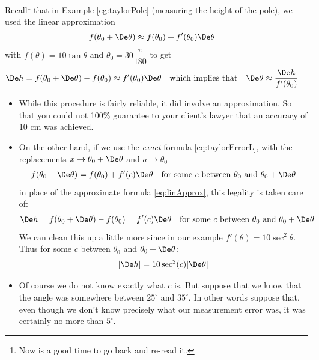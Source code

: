 \begin{eg}[More on $e^x$]
\end{eg}

\begin{eg}\label{eg_3_4_6}
Recall\footnote{Now is a good time to go back and re-read it.} that in Example
\ref{eg:taylorPole} (measuring the height of the pole), we
used the linear approximation
\begin{align*}%
f(\theta_0+\De\theta)&\approx f(\theta_0)+f'(\theta_0)\De\theta
\end{align*}
with $f(\theta)=10\tan\theta$ and $\theta_0=30\dfrac{\pi}{180}$ to get
\begin{align*}
\De h &=f(\theta_0+\De\theta)-f(\theta_0)\approx f'(\theta_0)\De\theta
  & \text{which implies that} &
  &\De\theta &\approx \frac{\De h}{f'(\theta_0)}
\end{align*}
\begin{itemize}
\item While this procedure is fairly reliable, it did involve an approximation.
So that you could not 100\% guarantee to your client's lawyer  that an accuracy of 10 cm
was achieved.
\item On the other hand, if we use the \emph{exact} formula \eqref{eq:taylorErrorL}, with
the replacements
$x\rightarrow \theta_0+\De\theta$ and $a\rightarrow\theta_0$
\begin{align*}
f(\theta_0+\De\theta)&=f(\theta_0)+f'(c)\De\theta
& \text{for some $c$ between $\theta_0$ and $\theta_0+\De\theta$}
\end{align*}
in place of the approximate formula \eqref{eq:linApprox}, this legality
is taken care of:
\begin{align*}
\De h &=f(\theta_0+\De\theta)-f(\theta_0) =f'(c)\De\theta
& \text{for some $c$ between $\theta_0$ and $\theta_0+\De\theta$}
\end{align*}
We can clean this up a little more since in our example $f'(\theta) = 10\sec^2\theta$.
Thus for some $c$ between $\theta_0$ and $\theta_0 + \De\theta$:
\begin{align*}
|\De h| = 10 \sec^2(c) |\De \theta|
\end{align*}



\item Of course we do not know exactly what $c$ is. But suppose that we know
that the angle was somewhere between $25^\circ$ and $35^\circ$. In other
words suppose that, even though we don't know precisely
what our measurement error was, it was certainly no more than $5^\circ$.


\end{itemize}
\end{eg}
